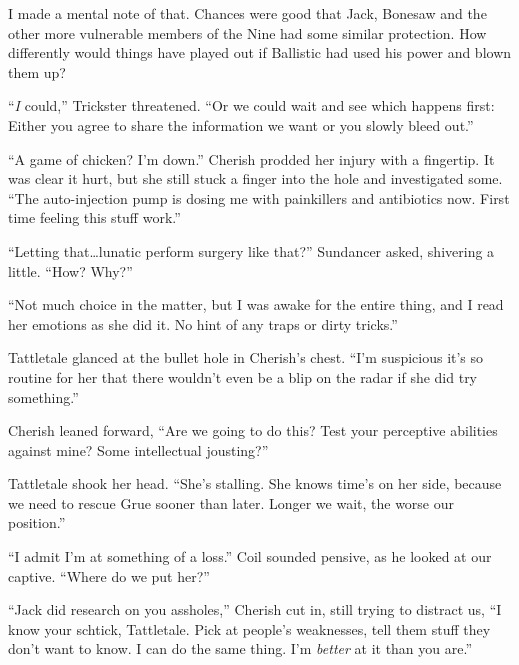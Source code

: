 I made a mental note of that.  Chances were good that Jack, Bonesaw and the other more vulnerable members of the Nine had some similar protection.  How differently would things have played out if Ballistic had used his power and blown them up?



``\emph{I }could,'' Trickster threatened.  ``Or we could wait and see which happens first: Either you agree to share the information we want or you slowly bleed out.''



``A game of chicken?  I'm down.''  Cherish prodded her injury with a fingertip.  It was clear it hurt, but she still stuck a finger into the hole and investigated some.  ``The auto-injection pump is dosing me with painkillers and antibiotics now.  First time feeling this stuff work.''



``Letting that\ldots lunatic perform surgery like that?'' Sundancer asked, shivering a little.  ``How?  Why?''



``Not much choice in the matter, but I was awake for the entire thing, and I read her emotions as she did it.  No hint of any traps or dirty tricks.''



Tattletale glanced at the bullet hole in Cherish's chest.  ``I'm suspicious it's so routine for her that there wouldn't even be a blip on the radar if she did try something.''



Cherish leaned forward, ``Are we going to do this?  Test your perceptive abilities against mine?  Some intellectual jousting?''



Tattletale shook her head.  ``She's stalling.  She knows time's on her side, because we need to rescue Grue sooner than later.  Longer we wait, the worse our position.''



``I admit I'm at something of a loss.'' Coil sounded pensive, as he looked at our captive.  ``Where do we put her?''



``Jack did research on you assholes,'' Cherish cut in, still trying to distract us, ``I know your schtick, Tattletale.  Pick at people's weaknesses, tell them stuff they don't want to know.  I can do the same thing.  I'm \emph{better} at it than you are.''



